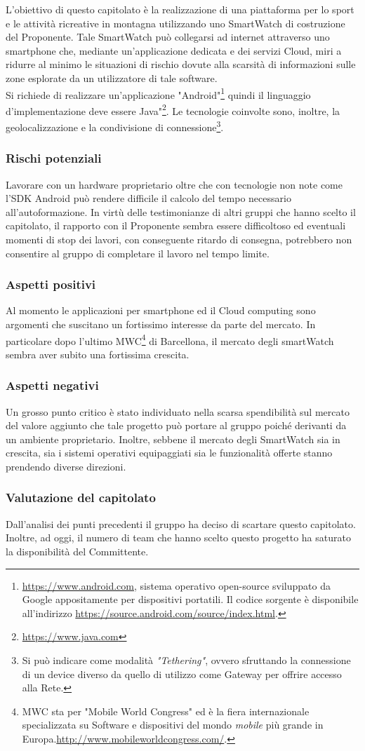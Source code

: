 L’obiettivo di questo capitolato è la realizzazione di una piattaforma per lo sport e le attività ricreative in montagna utilizzando uno SmartWatch di costruzione del Proponente. Tale SmartWatch può collegarsi ad internet attraverso uno smartphone che, mediante un’applicazione dedicata e dei servizi Cloud, miri a ridurre al minimo le situazioni di rischio dovute alla scarsità di informazioni sulle zone esplorate da un utilizzatore di tale software.\\
Si richiede di realizzare un'applicazione "Android"\footnote{\url{https://www.android.com}, sistema operativo open-source sviluppato da Google appositamente per dispositivi portatili. Il codice sorgente è disponibile all'indirizzo \url{https://source.android.com/source/index.html}.} quindi il linguaggio d'implementazione deve essere Java"\footnote{\url{https://www.java.com}}. Le tecnologie coinvolte sono, inoltre, la geolocalizzazione e la condivisione di connessione\footnote{Si può indicare come modalità \textit{"Tethering"}, ovvero sfruttando la connessione di un device diverso da quello di utilizzo come Gateway per offrire accesso alla Rete.}.
\subsubsection{Rischi potenziali}
Lavorare con un hardware proprietario oltre che con tecnologie non note come l’SDK Android può rendere difficile il calcolo del tempo necessario all’autoformazione.
In virtù delle testimonianze di altri gruppi che hanno scelto il capitolato, il rapporto con il Proponente sembra essere difficoltoso ed eventuali momenti di stop dei lavori, con conseguente ritardo di consegna, potrebbero non consentire al gruppo di completare il lavoro nel tempo limite.
\subsubsection{Aspetti positivi}
Al momento le applicazioni per smartphone ed il Cloud computing sono argomenti che suscitano un fortissimo interesse da parte del mercato. In particolare dopo l'ultimo MWC\footnote{MWC sta per "Mobile World Congress" ed è la fiera internazionale specializzata su Software e dispositivi del mondo \textit{mobile} più grande in Europa.\url{http://www.mobileworldcongress.com/}.} di Barcellona, il mercato degli smartWatch sembra aver subito una fortissima crescita.
\subsubsection{Aspetti negativi}
Un grosso punto critico è stato individuato nella scarsa spendibilità sul mercato del valore aggiunto che tale progetto può portare al gruppo poiché derivanti da un ambiente proprietario. Inoltre, sebbene il mercato degli SmartWatch sia in crescita, sia i sistemi operativi equipaggiati sia le funzionalità offerte stanno prendendo diverse direzioni.
\subsubsection{Valutazione del capitolato}
Dall’analisi dei punti precedenti il gruppo ha deciso di scartare questo capitolato.
Inoltre, ad oggi, il numero di team che hanno scelto questo progetto ha saturato la disponibilità del Committente.
